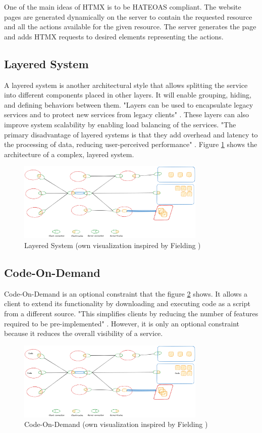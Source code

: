One of the main ideas of HTMX is to be HATEOAS compliant. The website pages are generated dynamically on the server to contain the requested resource and all the actions available for the given resource. The server generates the page and adds HTMX requests to desired elements representing the actions.

\subsection{Layered System}

A layered system is another architectural style that allows splitting the service into different components placed in other layers. It will enable grouping, hiding, and defining behaviors between them. "Layers can be used to encapsulate legacy services and to protect new services from legacy clients" \cite{fielding2000}. These layers can also improve system scalability by enabling load balancing of the services. "The primary disadvantage of layered systems is that they add overhead and latency to the processing of data, reducing user-perceived performance" \cite{Clark1990ArchitecturalCF}. Figure \ref{fig:layered-system} shows the architecture of a complex, layered system.

\begin{figure}[!h]
\centering
\includegraphics[width=0.8\textwidth, keepaspectratio]{figures/layered-system.png}
\caption{Layered System (own visualization inspired by Fielding \cite{fielding2000})}
\label{fig:layered-system}
\end{figure}

\subsection{Code-On-Demand}

Code-On-Demand is an optional constraint that the figure \ref{fig:code-on-demand} shows. It allows a client to extend its functionality by downloading and executing code as a script from a different source. "This simplifies clients by reducing the number of features required to be pre-implemented" \cite{fielding2000}. However, it is only an optional constraint because it reduces the overall visibility of a service.
 
\begin{figure}[!h]
\centering
\includegraphics[width=0.8\textwidth, keepaspectratio]{figures/code-on-demand.png}
\caption{Code-On-Demand (own visualization inspired by Fielding \cite{fielding2000})}
\label{fig:code-on-demand}
\end{figure}